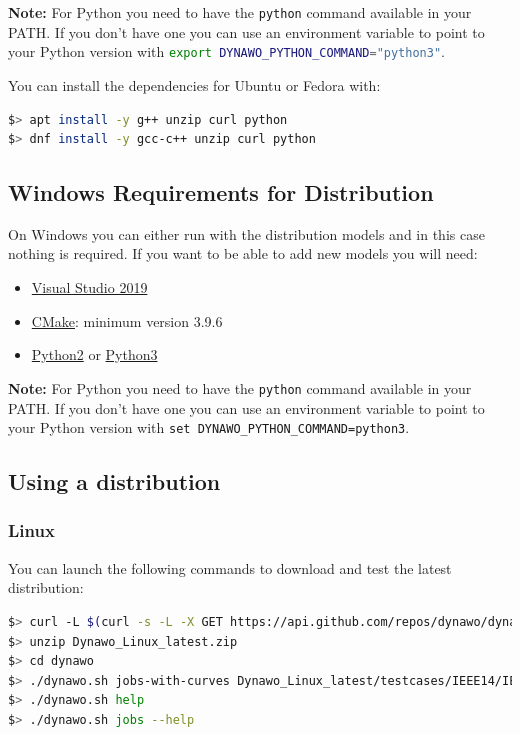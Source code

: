 \documentclass[a4paper, 12pt]{report}
\begin{document}
\textbf{Note:} For Python you need to have the \lstinline[language=bash]{python} command available in your PATH. If you don't have one you can use an environment variable to point to your Python version with \lstinline[language=bash]{export DYNAWO_PYTHON_COMMAND="python3"}.

You can install the dependencies for Ubuntu or Fedora with:
\begin{lstlisting}[language=bash]
$> apt install -y g++ unzip curl python
$> dnf install -y gcc-c++ unzip curl python
\end{lstlisting}

\subsection{Windows Requirements for Distribution}

On Windows you can either run \Dynawo with the distribution models and in this case nothing is required. If you want to be able to add new models you will need:

\begin{itemize}
\item \href{https://visualstudio.microsoft.com}{Visual Studio 2019}
\item \href{https://cmake.org/}{CMake}: minimum version 3.9.6
\item \href{https://www.python.org/ftp/python/2.7.18/python-2.7.18.amd64.msi}{Python2} or \href{https://www.python.org/ftp/python/3.8.2/python-3.8.2-amd64.exe}{Python3}
\end{itemize}

\textbf{Note:} For Python you need to have the \lstinline[language=bash]{python} command available in your PATH. If you don't have one you can use an environment variable to point to your Python version with \lstinline[language=command.com]{set DYNAWO_PYTHON_COMMAND=python3}.

\subsection{Using a distribution}

\subsubsection{Linux}

You can launch the following commands to download and test the latest distribution:

\begin{lstlisting}[language=bash, breaklines=true, breakatwhitespace=false]
$> curl -L $(curl -s -L -X GET https://api.github.com/repos/dynawo/dynawo/releases/latest | grep "Dynawo_Linux" | grep url | cut -d '"' -f 4) -o Dynawo_Linux_latest.zip
$> unzip Dynawo_Linux_latest.zip
$> cd dynawo
$> ./dynawo.sh jobs-with-curves Dynawo_Linux_latest/testcases/IEEE14/IEEE14_SyntaxExamples/IEEE14_ModelicaModel/IEEE14.jobs
$> ./dynawo.sh help
$> ./dynawo.sh jobs --help
\end{lstlisting}
\end{document}
